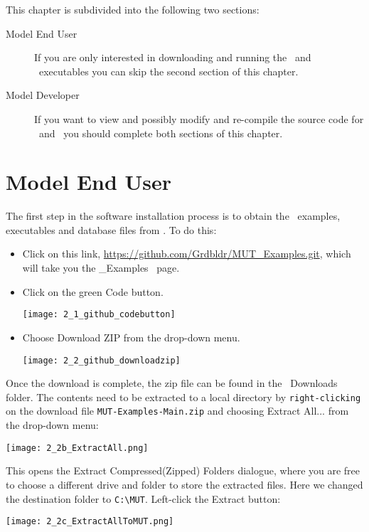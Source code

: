 \label{chapter:Installation}
This chapter is subdivided into the following two sections:
\begin{description}
    \item[Model End User] If you are only interested in downloading and running the \mut\ and \mfus\ executables you can skip the second section of this chapter.
    \item[Model Developer] If you want to view and possibly modify and re-compile the source code for \mut\ and \mfus\ you should complete both sections of this chapter.
\end{description}        

\section{Model End User}
The first step in the software installation process is to obtain the \mut\ examples, executables and database files from
\github.  To do this:
\begin{itemize}
     \item Click on this link, \url{https://github.com/Grdbldr/MUT_Examples.git}, which will take you the \mut\_Examples \github\ page.
     \item Click on the green {\sf Code} button.

        \texttt{[image: 2\_1\_github\_codebutton]}

     \item Choose {\sf Download ZIP} from the drop-down menu.

        \texttt{[image: 2\_2\_github\_downloadzip]}

\end{itemize}

Once the download is complete, the zip file can be found in the \windows\ {\sf Downloads} folder.  The contents need to be extracted to a local directory by {\tt right-clicking} on the download file {\tt MUT-Examples-Main.zip} and choosing {\sf Extract All...} from the drop-down menu:

        \texttt{[image: 2\_2b\_ExtractAll.png]}

This opens the {\sf Extract Compressed(Zipped) Folders} dialogue, where you are free to choose a different drive and folder to store the extracted files.  Here we changed the destination folder to \verb+C:\MUT+.  {Left-click} the {\sf Extract} button:

        \texttt{[image: 2\_2c\_ExtractAllToMUT.png]}

